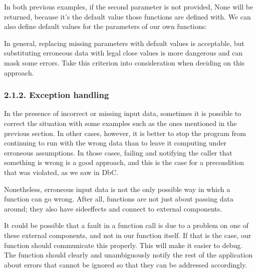\documentclass[a4paper,10pt,english]{sphinxmanual}
\begin{document}
In both previous examples, if the second parameter is not provided, None will be returned, because it’s the
default value those functions are defined with. We can also define default values for the parameters of our
own functions:

\begin{sphinxVerbatim}[commandchars=\\\{\}]
  
\end{sphinxVerbatim}

In general, replacing missing parameters with default values is acceptable, but substituting erroneous data
with legal close values is more dangerous and can mask some errors. Take this criterion into consideration
when deciding on this approach.


\subsubsection{2.1.2. Exception handling}
\label{\detokenize{chapters/3_general_traits/index:exception-handling}}
In the presence of incorrect or missing input data, sometimes it is possible to correct the situation with
some examples such as the ones mentioned in the previous section. In other cases, however, it is better to
stop the program from continuing to run with the wrong data than to leave it computing under erroneous
assumptions. In those cases, failing and notifying the caller that something is wrong is a good approach, and
this is the case for a precondition that was violated, as we saw in DbC.

Nonetheless, erroneous input data is not the only possible way in which a function can go wrong. After all,
functions are not just about passing data around; they also have side\sphinxhyphen{}effects and connect to external
components.

It could be possible that a fault in a function call is due to a problem on one of these external components,
and not in our function itself. If that is the case, our function should communicate this properly. This will
make it easier to debug. The function should clearly and unambiguously notify the rest of the application
about errors that cannot be ignored so that they can be addressed accordingly.
\end{document}
